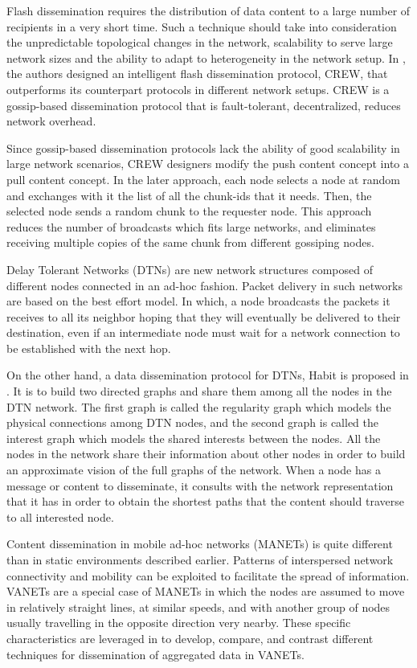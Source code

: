 \documentclass{IEEEtran}
\begin{document}
Flash dissemination requires the distribution of data content to a large number of recipients in a very short time. Such a technique should take into consideration the unpredictable topological changes in the network, scalability to serve large network sizes and the ability to adapt to heterogeneity in the network setup. In \cite{crew}, the authors designed an intelligent flash dissemination protocol, CREW, that outperforms its counterpart protocols in different network setups. CREW is a gossip-based dissemination protocol that is fault-tolerant, decentralized, reduces network overhead.

Since gossip-based dissemination protocols lack the ability of good scalability in large network scenarios, CREW designers modify the push content concept into a pull content concept. In the later approach, each node selects a node at random and exchanges with it the list of all the chunk-ids that it needs. Then, the selected node sends a random chunk to the requester node. This approach reduces the number of broadcasts which fits large networks, and eliminates receiving multiple copies of the same chunk from different gossiping nodes.

Delay Tolerant Networks (DTNs) are new network structures composed of different nodes connected in an ad-hoc fashion. Packet delivery in such networks are based on the best effort model. In which, a node broadcasts the packets it receives to all its neighbor hoping that they will eventually be delivered to their destination, even if an intermediate node must wait for a network connection to be established with the next hop.

On the other hand, a data dissemination protocol for DTNs, Habit is proposed in \cite{habit}. It is to build two directed graphs and share them among all the nodes in the DTN network. The first graph is called the regularity graph which models the physical connections among DTN nodes, and the second graph is called the interest graph which models the shared interests between the nodes. All the nodes in the network share their information about other nodes in order to build an approximate vision of the full graphs of the network. When a node has a message or content to disseminate, it consults with the network representation that it has in order to obtain the shortest paths that the content should traverse to all interested node.

Content dissemination in mobile ad-hoc networks (MANETs) is quite different than in static environments described earlier.
Patterns of interspersed network connectivity and mobility can be exploited to facilitate the spread of information.
VANETs are a special case of MANETs in which the nodes are assumed to move in relatively straight lines, at similar speeds, and with another group of nodes usually travelling in the opposite direction very nearby.
These specific characteristics are leveraged in \cite{vanet_dissem} to develop, compare, and contrast different techniques for dissemination of aggregated data in VANETs.
\end{document}
